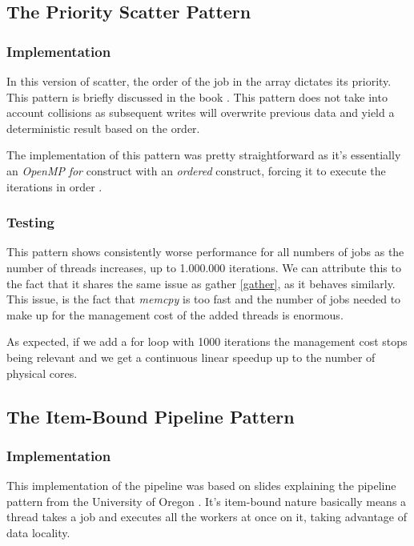 \documentclass[10pt,journal]{IEEEtran}
\begin{document}
\subsection{The Priority Scatter Pattern}
\subsubsection{Implementation}

In this version of scatter, the order of the job in the array dictates its priority. This pattern is briefly discussed in the book \cite{mccool}. This pattern does not take into account collisions as subsequent writes will overwrite previous data and yield a deterministic result based on the order.

The implementation of this pattern was pretty straightforward as it's essentially an \textit{OpenMP} \textit{for} construct with an \textit{ordered} construct, forcing it to execute the iterations in order \cite{omporder}.

\subsubsection{Testing}

This pattern shows consistently worse performance for all numbers of jobs as the number of threads increases, up to 1.000.000 iterations. We can attribute this to the fact that it shares the same issue as gather \ref{gather}, as it behaves similarly. This issue, is the fact that \textit{memcpy} is too fast and the number of jobs needed to make up for the management cost of the added threads is enormous.

As expected, if we add a for loop with 1000 iterations the management cost stops being relevant and we get a continuous linear speedup up to the number of physical cores. 

\subsection{The Item-Bound Pipeline Pattern}
\label{itembound}

\subsubsection{Implementation}

This implementation of the pipeline was based on slides explaining the pipeline pattern from the University of Oregon \cite{pipelineoregon}. It's item-bound nature basically means a thread takes a job and executes all the workers at once on it, taking advantage of data locality.
\end{document}
